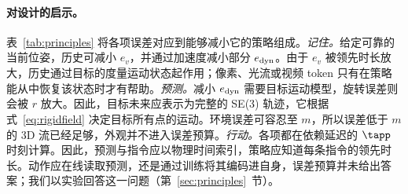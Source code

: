 

\paragraph{对设计的启示。}
表~\ref{tab:principles} 将各项误差对应到能够减小它的策略组成。\emph{记住。}给定可靠的当前位姿，历史可减小 $e_v$，并通过加速度减小部分 $e_{\rm dyn}$。由于 $e_v$ 被领先时长放大，历史通过目标的度量运动状态起作用；像素、光流或视频 token 只有在策略能从中恢复该状态时才有帮助。\emph{预测。}减小 $e_{\rm dyn}$ 需要目标运动模型，旋转误差则会被 $r$ 放大。因此，目标未来应表示为完整的 SE(3) 轨迹，它根据式~\eqref{eq:rigidfield} 决定目标所有点的运动。环境误差可容忍至 $m$，所以误差低于 $m$ 的 3D 流已经足够，外观并不进入误差预算。\emph{行动。}各项都在依赖延迟的 $\tapp$ 时刻计算。因此，预测与指令应以物理时间索引，策略应知道每条指令的领先时长。动作应在线读取预测，还是通过训练将其编码进自身，误差预算并未给出答案；我们以实验回答这一问题（第~\ref{sec:principles}~节）。
